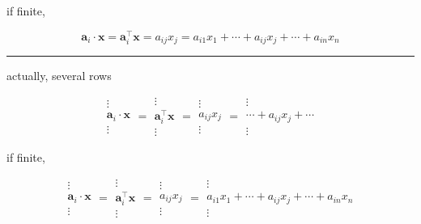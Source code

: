 \documentclass[
]{book}
\theoremstyle{definition}
\theoremstyle{definition}
\theoremstyle{definition}
\theoremstyle{definition}
\theoremstyle{remark}
\begin{document}
if finite,

\[
\boldsymbol{a}_{{\scriptscriptstyle i}}\cdot\boldsymbol{x}=\boldsymbol{a}_{{\scriptscriptstyle i}}^{\intercal}\boldsymbol{x}=a_{{\scriptscriptstyle ij}}x_{{\scriptscriptstyle j}}=a_{{\scriptscriptstyle i1}}x_{{\scriptscriptstyle 1}}+\cdots+a_{{\scriptscriptstyle ij}}x_{{\scriptscriptstyle j}}+\cdots+a_{{\scriptscriptstyle in}}x_{{\scriptscriptstyle n}}
\]

\begin{center}\rule{0.5\linewidth}{0.5pt}\end{center}

actually, several rows

\[
\begin{array}{c}
\vdots\\
\boldsymbol{a}_{{\scriptscriptstyle i}}\cdot\boldsymbol{x}\\
\vdots
\end{array}=\begin{array}{c}
\vdots\\
\boldsymbol{a}_{{\scriptscriptstyle i}}^{\intercal}\boldsymbol{x}\\
\vdots
\end{array}=\begin{array}{c}
\vdots\\
a_{{\scriptscriptstyle ij}}x_{{\scriptscriptstyle j}}\\
\vdots
\end{array}=\begin{array}{c}
\vdots\\
\cdots+a_{{\scriptscriptstyle ij}}x_{{\scriptscriptstyle j}}+\cdots\\
\vdots
\end{array}
\]

if finite,

\[
\begin{array}{c}
\vdots\\
\boldsymbol{a}_{{\scriptscriptstyle i}}\cdot\boldsymbol{x}\\
\vdots
\end{array}=\begin{array}{c}
\vdots\\
\boldsymbol{a}_{{\scriptscriptstyle i}}^{\intercal}\boldsymbol{x}\\
\vdots
\end{array}=\begin{array}{c}
\vdots\\
a_{{\scriptscriptstyle ij}}x_{{\scriptscriptstyle j}}\\
\vdots
\end{array}=\begin{array}{c}
\vdots\\
a_{{\scriptscriptstyle i1}}x_{{\scriptscriptstyle 1}}+\cdots+a_{{\scriptscriptstyle ij}}x_{{\scriptscriptstyle j}}+\cdots+a_{{\scriptscriptstyle in}}x_{{\scriptscriptstyle n}}\\
\vdots
\end{array}
\]
\end{document}
